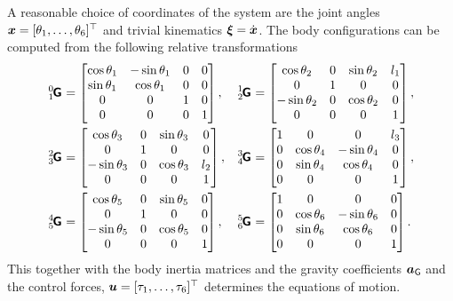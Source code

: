 A reasonable choice of coordinates of the system are the joint angles $\sysCoord = [\jointAngle[1], \ldots, \jointAngle[6]]^\top$ and trivial kinematics $\sysVel = \sysCoordd$.
The body configurations can be computed from the following relative transformations
\begin{align}
 \bodyHomoCoord{0}{1}{}{} &=
 \begin{bmatrix}
  \cos\jointAngle[1] & -\sin\jointAngle[1] & 0 & 0 \\
  \sin\jointAngle[1] &  \cos\jointAngle[1] & 0 & 0 \\
  0 & 0 & 1 & 0 \\
  0 & 0 & 0 & 1
 \end{bmatrix},&
 \bodyHomoCoord{1}{2}{}{} &=
 \begin{bmatrix}
  \cos\jointAngle[2] & 0 & \sin\jointAngle[2] & l_1 \\
  0 & 1 & 0 & 0 \\
  -\sin\jointAngle[2] & 0 & \cos\jointAngle[2] & 0 \\
  0 & 0 & 0 & 1
 \end{bmatrix},
\nonumber\\
 \bodyHomoCoord{2}{3}{}{} &=
 \begin{bmatrix}
  \cos\jointAngle[3] & 0 & \sin\jointAngle[3] & 0 \\
  0 & 1 & 0 & 0 \\
  -\sin\jointAngle[3] & 0 & \cos\jointAngle[3] & l_2 \\
  0 & 0 & 0 & 1
 \end{bmatrix},&
 \bodyHomoCoord{3}{4}{}{} &=
 \begin{bmatrix}
  1 & 0 & 0 & l_3 \\
  0 & \cos\jointAngle[4] & -\sin\jointAngle[4] & 0 \\
  0 & \sin\jointAngle[4] &  \cos\jointAngle[4] & 0 \\
  0 & 0 & 0 & 1
 \end{bmatrix},
\nonumber\\
 \bodyHomoCoord{4}{5}{}{} &=
 \begin{bmatrix}
  \cos\jointAngle[5] & 0 & \sin\jointAngle[5] & 0 \\
  0 & 1 & 0 & 0 \\
  -\sin\jointAngle[5] & 0 & \cos\jointAngle[5] & 0 \\
  0 & 0 & 0 & 1
 \end{bmatrix},&
 \bodyHomoCoord{5}{6}{}{} &=
 \begin{bmatrix}
  1 & 0 & 0 & 0 \\
  0 & \cos\jointAngle[6] & -\sin\jointAngle[6] & 0 \\
  0 & \sin\jointAngle[6] &  \cos\jointAngle[6] & 0 \\
  0 & 0 & 0 & 1
 \end{bmatrix}
 .
\end{align}
This together with the body inertia matrices and the gravity coefficients $\gravityAcc$ and the control forces, $\sysInput = [\tau_1, \ldots, \tau_6]^\top$ determines the equations of motion.

